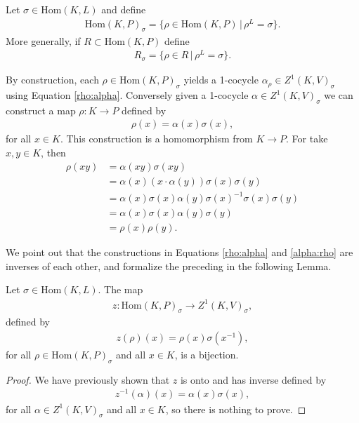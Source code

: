 \begin{definition} Let $\sigma \in \mathrm{Hom}(K, L)$ and define
\begin{align*} \mathrm{Hom}(K, P)_\sigma = \{ \rho \in \mathrm{Hom}(K, P) \,|\, \rho^L = \sigma\}. \end{align*}
More generally, if $R \subset \mathrm{Hom}(K, P)$ define
\begin{align*} R_\sigma = \{ \rho \in R \,|\, \rho^L = \sigma \}. \end{align*}
\end{definition}

By construction, each $\rho \in \mathrm{Hom}(K, P)_\sigma$ yields a 1-cocycle $\alpha_\rho \in Z^1(K, V)_\sigma$ using Equation \ref{rho:alpha}.
Conversely given a 1-cocycle $\alpha \in Z^1(K, V)_\sigma$ we can construct a map $\rho: K \rightarrow P$ defined by
\begin{align}\label{alpha:rho}
\rho(x) = \alpha(x)\sigma(x),
\end{align}
for all $x \in K$. This construction is a homomorphism from $K \rightarrow P$. For take $x, y \in K$, then
\begin{align*}
  \rho(x y) &= \alpha(x y) \sigma(x y) \\
  &= \alpha(x)(x \cdot \alpha(y)) \sigma(x) \sigma(y) \\
  &= \alpha(x) \sigma(x) \alpha(y) \sigma(x)^{-1} \sigma(x) \sigma(y) \\
  &= \alpha(x) \sigma(x) \alpha(y) \sigma(y) \\
  &= \rho(x) \rho(y).
\end{align*}

We point out that the constructions in Equations \ref{rho:alpha} and \ref{alpha:rho} are inverses of each other, and formalize the preceding in the following Lemma.

\begin{lemma}
  Let $\sigma \in \mathrm{Hom}(K, L)$. The map
\begin{align*} z: \mathrm{Hom}(K, P)_{\sigma} \rightarrow Z^1(K, V)_\sigma, \end{align*}
defined by
\begin{align*} z(\rho)(x) = \rho(x)\sigma(x^{-1}), \end{align*}
for all $\rho \in \mathrm{Hom}(K, P)_\sigma$ and all $x \in K$, is a bijection.
\label{lem:hom_z1}
\end{lemma}
\begin{proof}
We have previously shown that $z$ is onto and has inverse defined by
\begin{align*} z^{-1}(\alpha)(x) = \alpha(x)\sigma(x), \end{align*}
for all $\alpha \in Z^1(K, V)_\sigma$ and all $x \in K$, so there is nothing to prove.
\end{proof}

